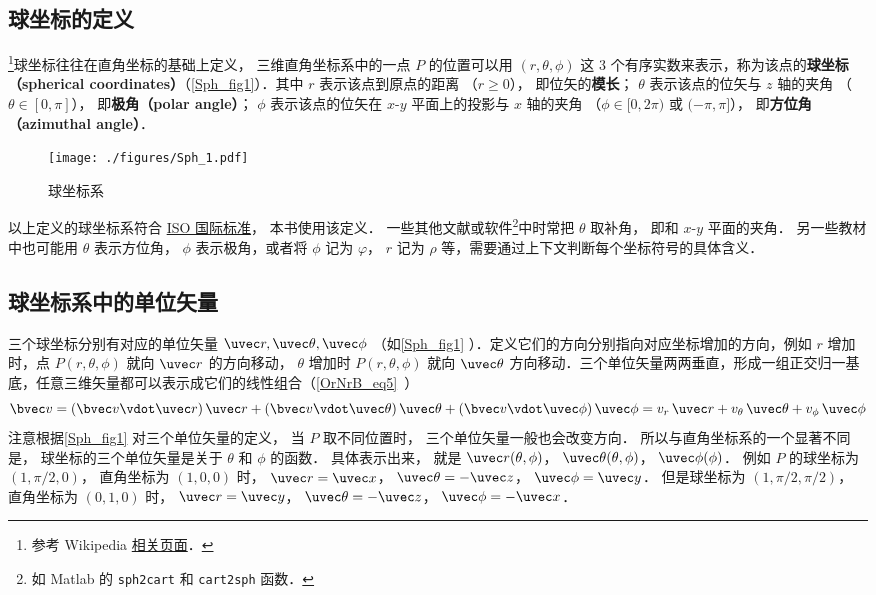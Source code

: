 

\subsection{球坐标的定义}

\footnote{参考 Wikipedia \href{https://en.wikipedia.org/wiki/Spherical_coordinate_system}{相关页面}．}球坐标往往在直角坐标的基础上定义， 三维直角坐标系中的一点 $P$ 的位置可以用 $(r,\theta ,\phi )$ 这 3 个有序实数来表示，称为该点的\textbf{球坐标（spherical coordinates）}（\autoref{Sph_fig1}）．其中 $r$ 表示该点到原点的距离 （$r \geqslant 0$）， 即位矢的\textbf{模长}； $\theta$ 表示该点的位矢与 $z$ 轴的夹角 （$\theta  \in [0,\pi]$）， 即\textbf{极角（polar angle）}； $\phi$ 表示该点的位矢在 $x$-$y$ 平面上的投影与 $x$ 轴的夹角 （$\phi  \in [0,2\pi)$ 或 $(- \pi,\pi]$）， 即\textbf{方位角（azimuthal angle）}．

\begin{figure}[ht]
\centering
\texttt{[image: ./figures/Sph\_1.pdf]}
\caption{球坐标系}\label{Sph_fig1}
\end{figure}

以上定义的球坐标系符合 \href{https://www.iso.org/standard/64973.html}{ISO 国际标准}， 本书使用该定义． 一些其他文献或软件\footnote{如 Matlab 的 \lstinline|sph2cart| 和 \lstinline|cart2sph| 函数．}中时常把 $\theta$ 取补角， 即和 $x$-$y$ 平面的夹角． 另一些教材中也可能用 $\theta $ 表示方位角， $\phi $ 表示极角，或者将 $\phi $ 记为 $\varphi $，  $r$ 记为 $\rho $ 等，需要通过上下文判断每个坐标符号的具体含义．

\subsection{球坐标系中的单位矢量}
三个球坐标分别有对应的单位矢量 $\uvec r, \uvec\theta, \uvec\phi$ （如\autoref{Sph_fig1} ）．定义它们的方向分别指向对应坐标增加的方向，例如 $r$ 增加时，点 $P(r,\theta ,\phi )$ 就向 $\uvec r$ 的方向移动， $\theta$ 增加时 $P(r,\theta ,\phi )$ 就向 $\uvec \theta$ 方向移动．三个单位矢量两两垂直，形成一组正交归一基底，任意三维矢量都可以表示成它们的线性组合（\autoref{OrNrB_eq5}~）
\begin{equation}\label{Sph_eq1}
\bvec v = (\bvec v \vdot \uvec r)\,\uvec r + (\bvec v \vdot \uvec \theta)\,\uvec \theta  + (\bvec v \vdot \uvec \phi)\,\uvec \phi  = v_r \,\uvec r + v_\theta \,\uvec \theta  + v_\phi \,\uvec \phi 
\end{equation}
注意根据\autoref{Sph_fig1} 对三个单位矢量的定义， 当 $P$ 取不同位置时， 三个单位矢量一般也会改变方向． 所以与直角坐标系的一个显著不同是， 球坐标的三个单位矢量是关于 $\theta$ 和 $\phi$ 的函数． 具体表示出来， 就是 $\uvec r(\theta ,\phi )$，  $\uvec \theta (\theta ,\phi )$，  $\uvec \phi (\phi )$． 
例如 $P$ 的球坐标为 $(1, \pi/2, 0)$， 直角坐标为 $(1, 0, 0)$ 时，
$\uvec r = \uvec x$， $\uvec \theta  =  - \uvec z$， $\uvec \phi  = \uvec y$． 
但是球坐标为 $(1, \pi/2, \pi/2)$， 直角坐标为 $(0, 1, 0)$ 时， $\uvec r = \uvec y$， $\uvec \theta  =  - \uvec z$， $\uvec \phi  =  - \uvec x$．

